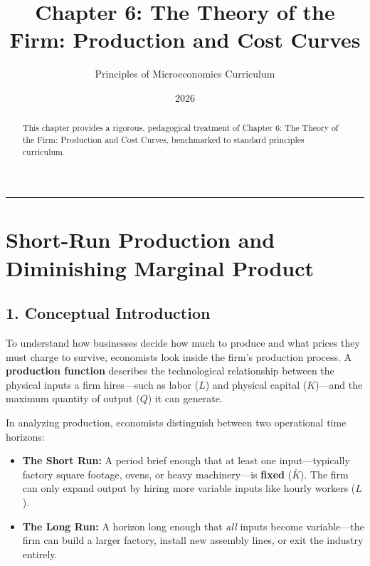 \documentclass[11pt,letterpaper]{article}
\begin{document}
\title{\Huge\bfseries\color{SlateBlue} Chapter 6: The Theory of the Firm: Production and Cost Curves}
\author{\large Principles of Microeconomics Curriculum}
\date{2026}
\maketitle

\thispagestyle{plain}

\begin{abstract}
This chapter provides a rigorous, pedagogical treatment of Chapter 6: The Theory of the Firm: Production and Cost Curves, benchmarked to standard principles curriculum.
\end{abstract}

\tableofcontents
\vspace{1.5em}
\hrule
\vspace{1.5em}

\section{Short-Run Production and Diminishing Marginal Product}

\subsection*{1. Conceptual Introduction}
To understand how businesses decide how much to produce and what prices they must charge to survive, economists look inside the firm's production process. A \textbf{production function} describes the technological relationship between the physical inputs a firm hires—such as labor ($L$) and physical capital ($K$)—and the maximum quantity of output ($Q$) it can generate.

In analyzing production, economists distinguish between two operational time horizons:
\begin{itemize}
    \item \textbf{The Short Run:} A period brief enough that at least one input—typically factory square footage, ovens, or heavy machinery—is \textbf{fixed} ($\bar{K}$). The firm can only expand output by hiring more variable inputs like hourly workers ($L$).
    \item \textbf{The Long Run:} A horizon long enough that \emph{all} inputs become variable—the firm can build a larger factory, install new assembly lines, or exit the industry entirely.
\end{itemize}
\end{document}
